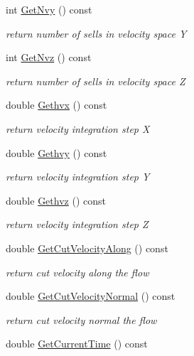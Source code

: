 \begin{DoxyCompactItemize}
int \mbox{\hyperlink{classkinetic_accc79e8415db86b99fba2dae741ecd92}{Get\+Nvy}} () const
\begin{DoxyCompactList}\small\item\em return number of sells in velocity space Y \end{DoxyCompactList}\item 
int \mbox{\hyperlink{classkinetic_a38b631033dd32eebf0ba3f4cc1bb0e9d}{Get\+Nvz}} () const
\begin{DoxyCompactList}\small\item\em return number of sells in velocity space Z \end{DoxyCompactList}\item 
double \mbox{\hyperlink{classkinetic_a383622d22e32de911bb9866f306ab236}{Gethvx}} () const
\begin{DoxyCompactList}\small\item\em return velocity integration step X \end{DoxyCompactList}\item 
double \mbox{\hyperlink{classkinetic_aed79c6b3b6a1a8c496bb104431f36b37}{Gethvy}} () const
\begin{DoxyCompactList}\small\item\em return velocity integration step Y \end{DoxyCompactList}\item 
double \mbox{\hyperlink{classkinetic_a057c3a53aa31d290367e3c8466184743}{Gethvz}} () const
\begin{DoxyCompactList}\small\item\em return velocity integration step Z \end{DoxyCompactList}\item 
double \mbox{\hyperlink{classkinetic_a66377a85ab8a6672fa84c1c03a9a0c2a}{Get\+Cut\+Velocity\+Along}} () const
\begin{DoxyCompactList}\small\item\em return cut velocity along the flow \end{DoxyCompactList}\item 
double \mbox{\hyperlink{classkinetic_a9ee5f7ffa87b177cda2532ffc56ac1ed}{Get\+Cut\+Velocity\+Normal}} () const
\begin{DoxyCompactList}\small\item\em return cut velocity normal the flow \end{DoxyCompactList}\item 
double \mbox{\hyperlink{classkinetic_af8c37c8a479f30dc2f5a5a25cd4b37b0}{Get\+Current\+Time}} () const

\end{DoxyCompactItemize}
